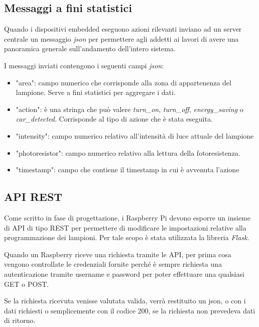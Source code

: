 
\newpage

\subsection{Messaggi a fini statistici}

Quando i dispositivi embedded eseguono azioni rilevanti inviano ad un server centrale un messaggio \textit{json} per permettere agli addetti ai lavori di avere una panoramica generale sull'andamento dell'intero sistema.

I messaggi inviati contengono i seguenti campi \textit{json}:
\begin{itemize}
	\item "area": campo numerico che corrisponde alla zona di appartenenza del lampione. Serve a fini statistici per aggregare i dati.
	\item "action": è una stringa che può valere \textit{turn\_on}, \textit{turn\_off}, \textit{energy\_saving} o \textit{car\_detected}. Corrisponde al tipo di azione che è stata eseguita.
	\item "intensity": campo numerico relativo all'intensità di luce attuale del lampione
	\item "photoresistor": campo numerico relativo alla lettura della fotoresistenza.
	\item "timestamp": campo che contiene il timestamp in cui è avvenuta l'azione
\end{itemize}

\subsection{API REST}

Come scritto in fase di progettazione, i Raspberry Pi devono esporre un insieme di API di tipo REST per permettere di modificare le impostazioni relative alla programmazione dei lampioni.
Per tale scopo è stata utilizzata la libreria \textit{Flask}.

Quando un Raspberry riceve una richiesta tramite le API, per prima cosa vengono controllate le credenziali fornite perché è sempre richiesta una autenticazione tramite username e password per poter effettuare una qualsiasi GET o POST.

Se la richiesta ricevuta venisse valutata valida, verrà restituito un json, o con i dati richiesti o semplicemente con il codice 200, se la richiesta non prevedeva dati di ritorno.


